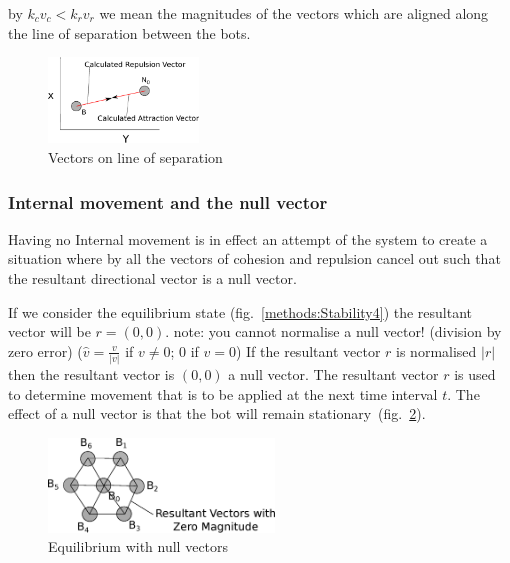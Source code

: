 \documentclass[10pt,journal,letterpaper,twoside]{IEEEtran}
\newcommand{\Stability}{Internal movement}
\newcommand{\Fig}{fig.}
\begin{document}
by $k_cv_c < k_rv_r$ we mean the magnitudes of the vectors which are aligned along the line of separation between the bots.

\begin{figure}[H]
\begin{center}
\includegraphics[width=4cm]{figures/Stability5}
\end{center}
\caption{Vectors on line of separation} \label{methods:Stability5}
\end{figure}

\subsubsection{\Stability{} and the null vector}\label{Section:StabilityNullVector}

Having no \Stability{} is in effect an attempt of the system to create a situation where by all the vectors of cohesion and repulsion cancel out such that the resultant directional vector is a null vector.

If we consider the equilibrium state (\Fig{}~\ref{methods:Stability4}) the resultant vector will be $r = (0,0)$. note: you cannot normalise a null vector! (division by zero error) ($\hat{v} = \frac{v}{|v|}$ if $v\neq0$; $0$ if $v=0$) If the resultant vector $r$ is normalised $|r|$ then the resultant vector is $(0,0)$ a null vector. The resultant vector $r$ is used to determine movement that is to be applied at the next time interval $t$. The effect of a null vector is that the bot will remain stationary~(\Fig{}~\ref{methods:StabilityNullVector}).

\begin{figure}[H]
\begin{center}
\includegraphics[width=6cm]{figures/StabilityNullVector}
\end{center}
\caption{Equilibrium with null vectors} \label{methods:StabilityNullVector}
\end{figure}
\end{document}
